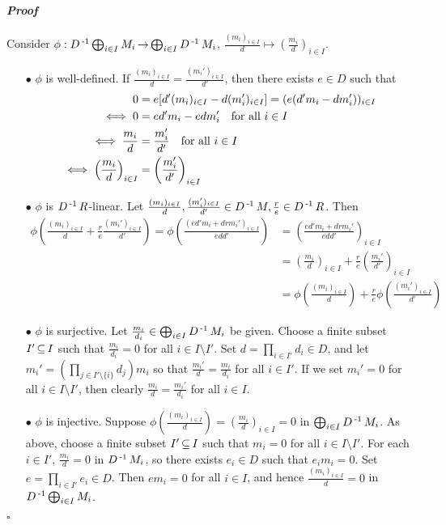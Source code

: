 \documentclass[11pt]{book}
\theoremstyle{definition}   \newtheorem{defn}[counter]{Definition} %
\newcommand{\bs}{\setminus}   \newcommand{\A}{\mathcal{A}}   \newcommand{\sy}{\textnormal{Syl}}   \newcommand{\size}[1]{\left| #1 \right|}
\DeclareMathOperator{\ra}{\rightarrow}   \DeclareMathOperator{\Poly}{\mathbf{P}}   \DeclareMathOperator{\spn}{\textnormal{span}}   \DeclareMathOperator{\aut}{\textnormal{Aut}}
\newenvironment{prf}{\paragraph{\textit{Proof}}}{\hfill$\square$}
\numberwithin{counter}{chapter}
\begin{document}
\begin{prf}
Consider $\phi : D\inv \bigoplus_{i\in I} M_i \ra \bigoplus_{i \in I} D\inv M_i$, $\frac{(m_i)_{i \in I}}{d} \mapsto \left(\frac{m_i}{d}\right)_{i \in I}$. 
\begin{enumerate}
\item[$\bullet$] $\phi$ is well-defined. If $\frac{(m_i)_{i \in I}}{d} = \frac{(m_i')_{i \in I}}{d'}$, then there exists $e \in D$ such that 
\begin{align*}
0 &= e[d'(m_i)_{i \in I} - d(m_i')_{i \in I}] = (e(d'm_i - dm_i'))_{i \in I} \\
\iff 0 &= ed'm_i - edm_i' \quad \textnormal{for all } i \in I \\
\iff \frac{m_i}{d} &= \frac{m_i'}{d'} \quad \textnormal{for all } i \in I \\
\iff \left(\frac{m_i}{d}\right)_{i \in I} &= \left(\frac{m_i'}{d'}\right)_{i \in I}
\end{align*}

\item[$\bullet$] $\phi$ is $D\operatorname{^{-1}} R$-linear. Let $\frac{(m_i)_{i \in I}}{d}, \frac{(m_i')_{i \in I}}{d'} \in D\operatorname{^{-1}} M, \frac{r}{e} \in D\operatorname{^{-1}} R$. Then
\begin{align*}
\phi \left(\frac{(m_i)_{i \in I}}{d} + \frac{r}{e} \frac{(m_i')_{i \in I}}{d'}\right) = \phi\left( \frac{(ed'm_i + drm_i')_{i \in I}}{edd'}\right) &= \left(\frac{ed'm_i + drm_i'}{edd'}\right)_{i \in I} \\
&= \left(\frac{m_i}{d}\right)_{i \in I} + \frac{r}{e} \left(\frac{m_i'}{d'}\right)_{i \in I} \\ &= \phi \left(\frac{(m_i)_{i \in I}}{d}\right) + \frac{r}{e} \phi \left(\frac{(m_i')_{i \in I}}{d'}\right)
\end{align*}

\item[$\bullet$] $\phi$ is surjective. Let $\frac{m_i}{d_i} \in \bigoplus_{i \in I} D\operatorname{^{-1}} M_i$ be given. Choose a finite subset $I' \operatorname{\subseteq} I$ such that $\frac{m_i}{d_i} = 0$ for all $i \in I \bs I'$. Set $d = \prod_{i \in I'} d_i \in D$, and let $m_i' = (\prod_{j \in I'\bs\{i\}} d_j) m_i$ so that $\frac{m_i'}{d} = \frac{m_i}{d_i}$ for all $i \in I'$. If we set $m_i' = 0$ for all $i \in I \bs I'$, then clearly $\frac{m_i}{d} = \frac{m_i'}{d_i}$ for all $i \in I$. 

\item[$\bullet$] $\phi$ is injective. Suppose $\phi \left( \frac{(m_i)_{i \in I}}{d} \right) = \left(\frac{m_i}{d}\right)_{i \in I} = 0$ in $\bigoplus_{i \in I} D\operatorname{^{-1}} M_i$. As above, choose a finite subset $I' \operatorname{\subseteq} I$ such that $m_i = 0$ for all $i \in I \bs I'$. For each $i \in I'$, $\frac{m_i}{d} = 0$ in $D\operatorname{^{-1}} M_i$, so there exists $e_i \in D$ such that $e_i m_i = 0$. Set $e = \prod_{i \in I'} e_i \in D$. Then $em_i = 0$ for all $i \in I$, and hence $\frac{(m_i)_{i \in I}}{d} = 0$ in $D\operatorname{^{-1}} \bigoplus_{i \in I} M_i$. 
\end{enumerate}
\end{prf}
\end{document}
